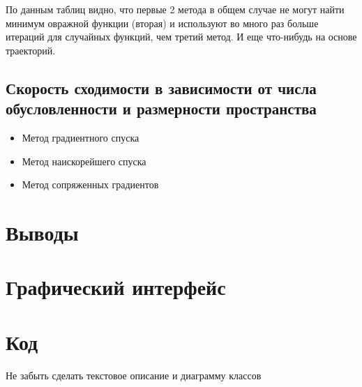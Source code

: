 По данным таблиц видно, что первые 2 метода в общем случае не могут найти минимум овражной функции (вторая) и используют во много раз больше итераций для случайных функций, чем третий метод.
И еще что-нибудь на основе траекторий.

\subsection{Скорость сходимости в зависимости от числа обусловленности и размерности пространства}

\begin{itemize}
	\item Метод градиентного спуска
	
	\item Метод наискорейшего спуска
	
	\item Метод сопряженных градиентов
\end{itemize}

\section{Выводы}

\section{Графический интерфейс}

\section{Код}
Не забыть сделать текстовое описание и диаграмму классов



